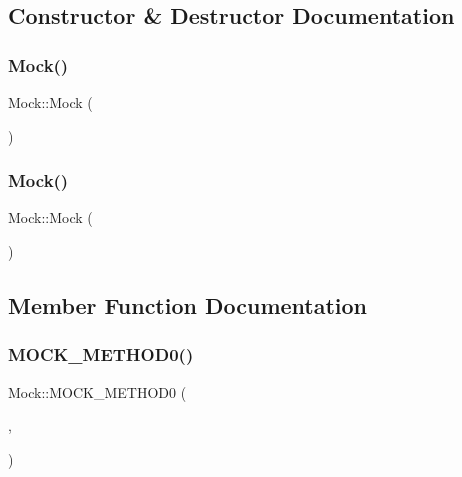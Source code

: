 \subsection{Constructor \& Destructor Documentation}
\mbox{\label{class_mock_a2b9528f2e7fcf9738201a5ea667c1998}} 
\subsubsection{\texorpdfstring{Mock()}{Mock()}\hspace{0.1cm}{\footnotesize\ttfamily [1/2]}}
{\footnotesize\ttfamily Mock\+::\+Mock (\begin{DoxyParamCaption}{ }\end{DoxyParamCaption})\hspace{0.3cm}{\ttfamily [inline]}}

\mbox{\label{class_mock_a2b9528f2e7fcf9738201a5ea667c1998}} 
\subsubsection{\texorpdfstring{Mock()}{Mock()}\hspace{0.1cm}{\footnotesize\ttfamily [2/2]}}
{\footnotesize\ttfamily Mock\+::\+Mock (\begin{DoxyParamCaption}{ }\end{DoxyParamCaption})\hspace{0.3cm}{\ttfamily [inline]}}



\subsection{Member Function Documentation}
\mbox{\label{class_mock_ae710f23cafb1a2f17772e8805d6312d2}} 
\subsubsection{\texorpdfstring{M\+O\+C\+K\+\_\+\+M\+E\+T\+H\+O\+D0()}{MOCK\_METHOD0()}}
{\footnotesize\ttfamily Mock\+::\+M\+O\+C\+K\+\_\+\+M\+E\+T\+H\+O\+D0 (\begin{DoxyParamCaption}\item[{Do\+This}]{,  }\item[{void()}]{ }\end{DoxyParamCaption})}

